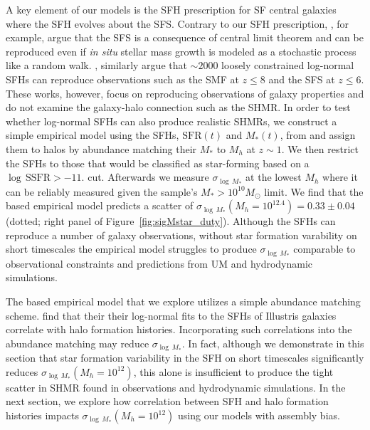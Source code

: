 \documentclass[12pt, letterpaper, preprint, tighten]{aastex62}
\newcommand{\edt}[1]{{\color{dred}{\bf} #1}}
\begin{document}
A key element of our models is the SFH prescription for SF central galaxies where
the SFH evolves about the SFS. Contrary to our SFH prescription, \cite{kelson2014},
for example, argue that the SFS is a consequence of central limit theorem
and can be reproduced even if \emph{in situ} stellar mass growth is modeled as
a stochastic process like a random walk. \cite{gladders2013,abramson2015,abramson2016},
similarly argue that $\sim2000$ loosely constrained log-normal SFHs can reproduce
observations such as the SMF at $z \leq 8$ and the SFS at $z \leq 6$. These works,
however, focus on reproducing observations of galaxy properties and do not examine
the galaxy-halo connection such as the SHMR. In order to test whether log-normal
SFHs can also produce realistic SHMRs,
\edt{we construct a simple empirical model using  the SFHs, $\mathrm{SFR}(t)$ and
$M_*(t)$, from \cite{abramson2016} and assign them to halos by abundance matching
their $M_*$ to $M_h$ at $z{\sim}1$.}
We then restrict the SFHs to those that would be classified as star-forming based
on a $\log\,\mathrm{SSFR} > -11.$ cut. Afterwards we measure $\sigma_{\log\,M_*}$
at the lowest $M_h$ where it can be reliably measured given the \cite{abramson2016}
sample's $M_*{>}10^{10}M_\odot$ limit.
\edt{We find that the \cite{abramson2016} based empirical model predicts a scatter
of $\sigma_{\log\,M_*}(M_h=10^{12.4}) = 0.33\pm0.04$ (dotted; right panel of Figure~\ref{fig:sigMstar_duty}).
Although the \cite{abramson2016} SFHs can reproduce a number of galaxy observations,
without star formation varability on short timescales the empirical model struggles
to produce $\sigma_{\log\,M_*}$ comparable to observational constraints and predictions
from UM and hydrodynamic simulations.}

\edt{The \cite{abramson2016} based empirical model that we explore utilizes a simple
abundance matching scheme. \cite{diemer2017} find that their their log-normal fits
to the SFHs of Illustris galaxies correlate with halo formation histories. Incorporating
such correlations into the abundance matching may reduce $\sigma_{\log\,M_*}$.
In fact, although we demonstrate in this section that star formation variability
in the SFH on short timescales significantly reduces $\sigma_{\log\,M_*}(M_h=10^{12})$,
this alone is insufficient to produce the tight scatter in SHMR found in
observations and hydrodynamic simulations. In the next section, we explore how
correlation between SFH and halo formation histories impacts $\sigma_{\log\,M_*}(M_h=10^{12})$
using our models with assembly bias.
}
\end{document}

